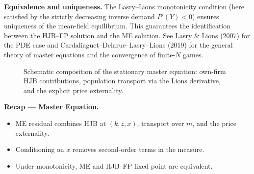 \documentclass[11pt,letterpaper,oneside]{article}
\numberwithin{equation}{section}
\newcommand{\1}{\mathbf{1}}
\newcommand{\Dm}{D\_m}
\begin{document}
\begin{tcolorbox}[literaturestyle]
\textbf{Equivalence and uniqueness.} The Lasry--Lions monotonicity condition (here satisfied by the strictly decreasing inverse demand $P'(Y)<0$) ensures uniqueness of the mean-field equilibrium. This guarantees the identification between the HJB--FP solution and the ME solution. See Lasry \& Lions (2007) for the PDE case and Cardaliaguet--Delarue--Lasry--Lions (2019) for the general theory of master equations and the convergence of finite-$N$ games.
\end{tcolorbox}

\begin{figure}[ht]
\centering
{}
\caption{Schematic composition of the stationary master equation: own-firm HJB contributions, population transport via the Lions derivative, and the explicit price externality.}
\end{figure}

\begin{tcolorbox}[didacticstyle]
\textbf{Recap — Master Equation.}
\begin{itemize}[leftmargin=1.15em,itemsep=0.2em]
  \item ME residual combines HJB at $(k,z,x)$, transport over $m$, and the price externality.
  \item Conditioning on $x$ removes second-order terms in the measure.
  \item Under monotonicity, ME and HJB--FP fixed point are equivalent.
\end{itemize}
\end{tcolorbox}

\end{document}
